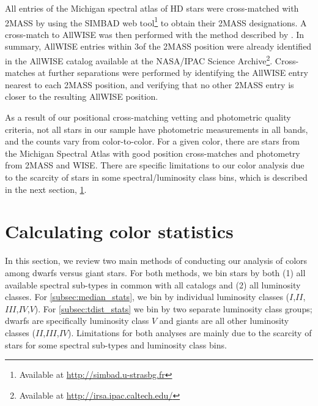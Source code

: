 All entries of the Michigan spectral atlas of HD stars were cross-matched with 2MASS \citep{Skrutskie2006} by using the SIMBAD web tool\footnote{Available at \url{http://simbad.u-strasbg.fr}} to obtain their 2MASS designations. A cross-match to AllWISE \cite{ALLWISE,ALLWISE-dwarfs} was then performed with the method described by \cite{BANYAN}. In summary, AllWISE entries within 3\arcsec of the 2MASS position were already identified in the AllWISE catalog available at the NASA/IPAC Science Archive\footnote{Available at \url{http://irsa.ipac.caltech.edu/}}. Cross-matches at further separations were performed by identifying the AllWISE entry nearest to each 2MASS position, and verifying that no other 2MASS entry is closer to the resulting AllWISE position.

As a result of our positional cross-matching vetting and photometric quality criteria, not all stars in our sample have photometric measurements in all bands, and the counts vary from color-to-color. For a given color, there are \bincount stars from the Michigan Spectral Atlas with good position cross-matches and photometry from 2MASS and WISE. There are specific limitations to our color analysis due to the scarcity of stars in some spectral/luminosity class bins, which is described in the next section, \ref{sec:color_stats}.

\section{Calculating color statistics} \label{sec:color_stats}
In this section, we review two main methods of conducting our analysis of colors among dwarfs versus giant stars. For both methods, we bin stars by both (1) all available spectral sub-types in common with all catalogs and (2) all luminosity classes. For \ref{subsec:median_stats}, we bin by individual luminosity classes ($I$,$II$,$III$,$IV$,$V$). For \ref{subsec:tdist_stats} we bin by two separate luminosity class groups; dwarfs are specifically luminosity class $V$ and giants are all other luminosity classes ($II$,$III$,$IV$). Limitations for both analyses are mainly due to the scarcity of stars for some spectral sub-types and luminosity class bins. 

